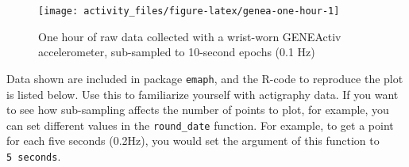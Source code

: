 \documentclass[]{book}
\newenvironment{Shaded}{\begin{snugshade}}{\end{snugshade}}
\newcommand{\KeywordTok}[1]{\textcolor[rgb]{0.13,0.29,0.53}{\textbf{#1}}}
\newcommand{\DataTypeTok}[1]{\textcolor[rgb]{0.13,0.29,0.53}{#1}}
\newcommand{\DecValTok}[1]{\textcolor[rgb]{0.00,0.00,0.81}{#1}}
\newcommand{\StringTok}[1]{\textcolor[rgb]{0.31,0.60,0.02}{#1}}
\newcommand{\CommentTok}[1]{\textcolor[rgb]{0.56,0.35,0.01}{\textit{#1}}}
\newcommand{\OperatorTok}[1]{\textcolor[rgb]{0.81,0.36,0.00}{\textbf{#1}}}
\newcommand{\NormalTok}[1]{#1}
\begin{document}
\begin{figure}

{\centering \texttt{[image: activity\_files/figure-latex/genea-one-hour-1]} 

}

\caption{One hour of raw data collected with a wrist-worn GENEActiv accelerometer, sub-sampled to 10-second epochs (0.1 Hz)}\label{fig:genea-one-hour}
\end{figure}

Data shown are included in package \texttt{emaph}, and the R-code to
reproduce the plot is listed below. Use this to familiarize yourself
with actigraphy data. If you want to see how sub-sampling affects the
number of points to plot, for example, you can set different values in
the \texttt{round\_date} function. For example, to get a point for each
five seconds (0.2Hz), you would set the argument of this function to
\texttt{5\ seconds}.

\begin{Shaded}
\end{Shaded}
\end{document}
